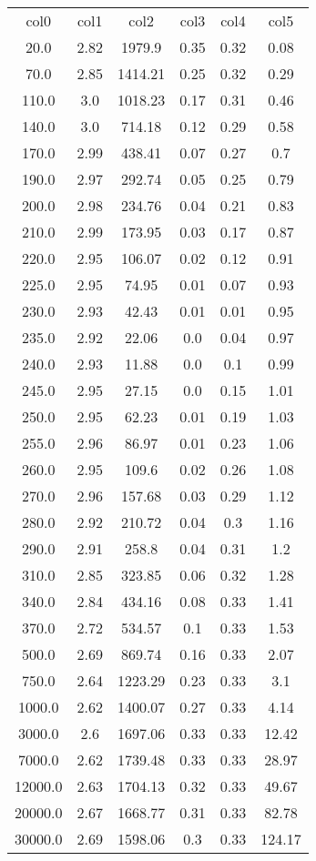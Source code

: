 \begin{table}
\begin{tabular}{cccccc}
col0 & col1 & col2 & col3 & col4 & col5 \\
20.0 & 2.82 & 1979.9 & 0.35 & 0.32 & 0.08 \\
70.0 & 2.85 & 1414.21 & 0.25 & 0.32 & 0.29 \\
110.0 & 3.0 & 1018.23 & 0.17 & 0.31 & 0.46 \\
140.0 & 3.0 & 714.18 & 0.12 & 0.29 & 0.58 \\
170.0 & 2.99 & 438.41 & 0.07 & 0.27 & 0.7 \\
190.0 & 2.97 & 292.74 & 0.05 & 0.25 & 0.79 \\
200.0 & 2.98 & 234.76 & 0.04 & 0.21 & 0.83 \\
210.0 & 2.99 & 173.95 & 0.03 & 0.17 & 0.87 \\
220.0 & 2.95 & 106.07 & 0.02 & 0.12 & 0.91 \\
225.0 & 2.95 & 74.95 & 0.01 & 0.07 & 0.93 \\
230.0 & 2.93 & 42.43 & 0.01 & 0.01 & 0.95 \\
235.0 & 2.92 & 22.06 & 0.0 & 0.04 & 0.97 \\
240.0 & 2.93 & 11.88 & 0.0 & 0.1 & 0.99 \\
245.0 & 2.95 & 27.15 & 0.0 & 0.15 & 1.01 \\
250.0 & 2.95 & 62.23 & 0.01 & 0.19 & 1.03 \\
255.0 & 2.96 & 86.97 & 0.01 & 0.23 & 1.06 \\
260.0 & 2.95 & 109.6 & 0.02 & 0.26 & 1.08 \\
270.0 & 2.96 & 157.68 & 0.03 & 0.29 & 1.12 \\
280.0 & 2.92 & 210.72 & 0.04 & 0.3 & 1.16 \\
290.0 & 2.91 & 258.8 & 0.04 & 0.31 & 1.2 \\
310.0 & 2.85 & 323.85 & 0.06 & 0.32 & 1.28 \\
340.0 & 2.84 & 434.16 & 0.08 & 0.33 & 1.41 \\
370.0 & 2.72 & 534.57 & 0.1 & 0.33 & 1.53 \\
500.0 & 2.69 & 869.74 & 0.16 & 0.33 & 2.07 \\
750.0 & 2.64 & 1223.29 & 0.23 & 0.33 & 3.1 \\
1000.0 & 2.62 & 1400.07 & 0.27 & 0.33 & 4.14 \\
3000.0 & 2.6 & 1697.06 & 0.33 & 0.33 & 12.42 \\
7000.0 & 2.62 & 1739.48 & 0.33 & 0.33 & 28.97 \\
12000.0 & 2.63 & 1704.13 & 0.32 & 0.33 & 49.67 \\
20000.0 & 2.67 & 1668.77 & 0.31 & 0.33 & 82.78 \\
30000.0 & 2.69 & 1598.06 & 0.3 & 0.33 & 124.17 \\
\end{tabular}
\end{table}
